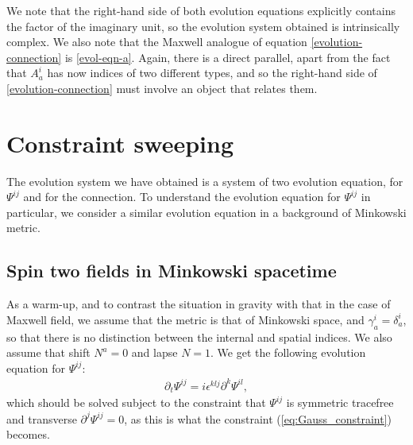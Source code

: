 \documentclass[10pt]{report}
\theoremstyle{definition}
\newcommand{\im}{i}
\begin{document}
We note that the right-hand side of both evolution equations explicitly contains the factor of the imaginary unit, so the evolution system obtained is intrinsically complex. We also note that the Maxwell analogue of equation \cref{evolution-connection} is \cref{evol-eqn-a}. Again, there is a direct parallel, apart from the fact that $A_a^i$ has now indices of two different types, and so the right-hand side of \cref{evolution-connection} must involve an object that relates them. 

\section{Constraint sweeping} \label{sec:numerical-purec-connection-gauge-fixing}

The evolution system we have obtained is a system of two evolution equation, for $\Psi^{ij}$ and for the connection. To understand the evolution equation for $\Psi^{ij}$ in particular, we consider a similar evolution equation in a background of Minkowski metric. 

\subsection{Spin two fields in Minkowski spacetime}

As a warm-up, and to contrast the situation in gravity with that in the case of Maxwell field, we assume that the metric is that of Minkowski space, and $\gamma^i_a=\delta^i_a$, so that there is no distinction between the internal and spatial indices. We also assume that shift $N^a=0$ and lapse $N=1$. We get the following evolution equation for $\Psi^{ij}$:
\begin{align}\label{psi-evolution-flat}
\partial_t \Psi^{ij} = \im \epsilon^{klj} \partial^k \Psi^{il},
\end{align}
which should be solved subject to the constraint that $\Psi^{ij}$ is symmetric tracefree and transverse $\partial^j \Psi^{ij}=0$, as this is what the constraint (\ref{eq:Gauss_constraint}) becomes. 
\end{document}

